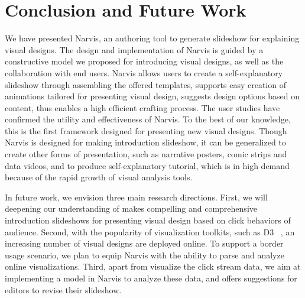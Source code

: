 \section{Conclusion and Future Work}
We have presented Narvis, an authoring tool to generate slideshow for explaining visual designs. 
The design and implementation of Narvis is guided by a constructive model we proposed for introducing visual designs, as well as the collaboration with end users. 
Narvis allows users to create a self-explanatory slideshow through assembling the offered templates, supports easy creation of animations tailored for presenting visual design, suggests design options based on content, thus enables a high efficient crafting process.
The user studies have confirmed the utility and effectiveness of Narvis. To the best of our knowledge, this is the first framework designed for presenting new visual designs. Though Narvis is designed for making introduction slideshow, it can be generalized to create other forms of presentation, such as narrative posters, comic strips and data videos, and to produce self-explanatory tutorial, which is in high demand because of the rapid growth of visual analysis tools.

In future work, we envision three main research directions. 
First, we will deepening our understanding of makes compelling and comprehensive introduction slideshows for presenting visual design based on click behaviors of audience. 
Second, with the popularity of visualization toolkits, such as D3 ~\cite{bostock2011d3}, an increasing number of visual designs are deployed online. To support a border usage scenario, we plan to equip Narvis with the ability to parse and analyze online visualizations. 
Third, apart from visualize the click stream data, we aim at implementing a model in Narvis to analyze these data, and offers suggestions for editors to revise their slideshow.  
